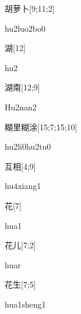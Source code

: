 \begin{verbete}[hu2luo2bo0]{胡萝卜}[9;11;2]
\begin{pronuncia}{hu2luo2bo0}
\end{pronuncia}
\end{verbete}

\begin{verbete}[hu2]{湖}[12]
\begin{pronuncia}{hu2}
\end{pronuncia}
\end{verbete}

\begin{verbete}[Hu2nan2]{湖南}[12;9]
\begin{pronuncia}{Hu2nan2}
\end{pronuncia}
\end{verbete}

\begin{verbete}[hu2li0hu2tu0]{糊里糊涂}[15;7;15;10]
\begin{pronuncia}[\\]{hu2li0hu2tu0}
\end{pronuncia}
\end{verbete}

\begin{verbete}[hu4xiang1]{互相}[4;9]
\begin{pronuncia}{hu4xiang1}
\end{pronuncia}
\end{verbete}

\begin{verbete}[hua1]{花}[7]
\begin{pronuncia}{hua1}
\end{pronuncia}
\end{verbete}

\begin{verbete}[huar1]{花儿}[7;2]
\begin{pronuncia}{huar}
\end{pronuncia}
\end{verbete}

\begin{verbete}{花生}[7;5]
\begin{pronuncia}{hua1sheng1}
\end{pronuncia}
\end{verbete}

